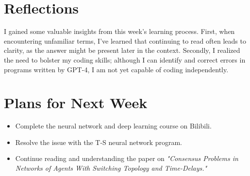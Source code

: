 \documentclass{article}
\begin{document}
\section*{Reflections}
I gained some valuable insights from this week's learning process. First, when encountering unfamiliar terms, I've learned that continuing to read often leads to clarity, as the answer might be present later in the context. Secondly, I realized the need to bolster my coding skills; although I can identify and correct errors in programs written by GPT-4, I am not yet capable of coding independently.

\section*{Plans for Next Week}
\begin{itemize}
    \item Complete the neural network and deep learning course on Bilibili.
    \item Resolve the issue with the T-S neural network program.
    \item Continue reading and understanding the paper on \textit{"Consensus Problems in Networks of Agents With Switching Topology and Time-Delays."}
\end{itemize}

\end{document}
